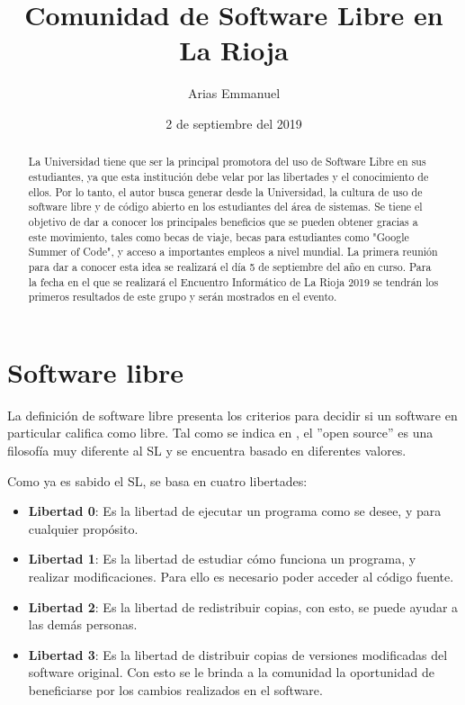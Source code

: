 \documentclass[12pt]{article}
\title{Comunidad de Software Libre en La Rioja}
\author{Arias Emmanuel}
\date{2 de septiembre del 2019}
\begin{document}
\maketitle
\newpage

\begin{abstract}
	La Universidad tiene que ser la principal promotora del uso de Software Libre en sus estudiantes, ya que esta institución
	debe velar por las libertades y el conocimiento de ellos. Por lo tanto, el autor busca generar desde la 
	Universidad, la cultura de uso de software libre y de código abierto en los estudiantes del área de sistemas. Se tiene el objetivo de 
	dar a conocer los principales beneficios que se pueden obtener gracias a este movimiento, tales como becas de viaje, becas
	para estudiantes como "Google Summer of Code", y acceso a importantes empleos a nivel mundial. La primera reunión
	para dar a conocer esta idea se realizará el día 5 de septiembre del año en curso. Para la fecha en el que se
	realizará el Encuentro Informático de La Rioja 2019 se tendrán los primeros resultados de este grupo y serán mostrados en el
	evento.
\end{abstract}

\section{Software libre}
La definición de software libre presenta los criterios para decidir si un software en particular califica como libre. Tal como se indica en \cite{freesw}, el ''open source'' es una filosofía muy diferente al SL y se encuentra basado en diferentes valores. 

Como  ya es sabido el SL, se basa en cuatro libertades:
\begin{itemize}
	\item \textbf{Libertad 0}: Es la libertad de ejecutar un programa como se desee, y para cualquier propósito.
	\item \textbf{Libertad 1}: Es la libertad de estudiar cómo funciona un programa, y realizar modificaciones. Para ello es necesario poder acceder al código fuente. 
	\item \textbf{Libertad 2}: Es la libertad de redistribuir copias, con esto, se puede ayudar a las demás personas. 
	\item \textbf{Libertad 3}: Es la libertad de distribuir copias de versiones modificadas del software original. Con esto se le brinda a la comunidad la oportunidad de beneficiarse por los cambios realizados en el software. 
\end{itemize}
\end{document}
